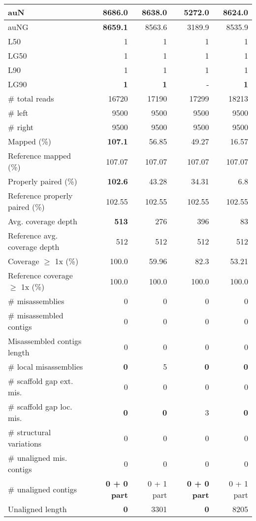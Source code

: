 \documentclass[12pt,a4paper]{article}
\begin{document}
\begin{table}[ht]
\begin{center}
\begin{tabular}{|l*{4}{|r}|}
auN & {\bf 8686.0} & 8638.0 & 5272.0 & 8624.0 \\ \hline
auNG & {\bf 8659.1} & 8563.6 & 3189.9 & 8535.9 \\ \hline
L50 & 1 & 1 & 1 & 1 \\ \hline
LG50 & 1 & 1 & 1 & 1 \\ \hline
L90 & 1 & 1 & 1 & 1 \\ \hline
LG90 & {\bf 1} & {\bf 1} & - & {\bf 1} \\ \hline
\# total reads & 16720 & 17190 & 17299 & 18213 \\ \hline
\# left & 9500 & 9500 & 9500 & 9500 \\ \hline
\# right & 9500 & 9500 & 9500 & 9500 \\ \hline
Mapped (\%) & {\bf 107.1} & 56.85 & 49.27 & 16.57 \\ \hline
Reference mapped (\%) & 107.07 & 107.07 & 107.07 & 107.07 \\ \hline
Properly paired (\%) & {\bf 102.6} & 43.28 & 34.31 & 6.8 \\ \hline
Reference properly paired (\%) & 102.55 & 102.55 & 102.55 & 102.55 \\ \hline
Avg. coverage depth & {\bf 513} & 276 & 396 & 83 \\ \hline
Reference avg. coverage depth & 512 & 512 & 512 & 512 \\ \hline
Coverage $\geq$ 1x (\%) & 100.0 & 59.96 & 82.3 & 53.21 \\ \hline
Reference coverage $\geq$ 1x (\%) & 100.0 & 100.0 & 100.0 & 100.0 \\ \hline
\# misassemblies & 0 & 0 & 0 & 0 \\ \hline
\# misassembled contigs & 0 & 0 & 0 & 0 \\ \hline
Misassembled contigs length & 0 & 0 & 0 & 0 \\ \hline
\# local misassemblies & {\bf 0} & 5 & {\bf 0} & {\bf 0} \\ \hline
\# scaffold gap ext. mis. & 0 & 0 & 0 & 0 \\ \hline
\# scaffold gap loc. mis. & {\bf 0} & {\bf 0} & 3 & {\bf 0} \\ \hline
\# structural variations & 0 & 0 & 0 & 0 \\ \hline
\# unaligned mis. contigs & 0 & 0 & 0 & 0 \\ \hline
\# unaligned contigs & {\bf 0 + 0 part} & 0 + 1 part & {\bf 0 + 0 part} & 0 + 1 part \\ \hline
Unaligned length & {\bf 0} & 3301 & {\bf 0} & 8205 \\ \hline

\end{tabular}
\end{center}
\end{table}
\end{document}
